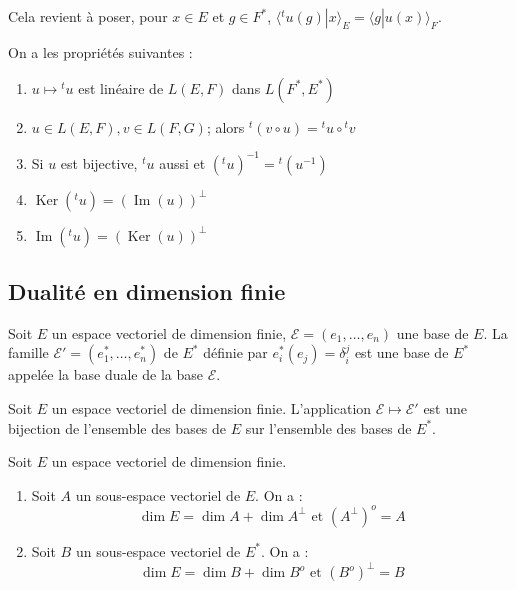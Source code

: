 \begin{rem}
Cela revient à poser, pour $x \in E$ et $g \in F^*$, $\langle {}^tu(g)|x\rangle_E = \langle g|u(x)\rangle_F$.
\end{rem}

\begin{thm}
On a les propriétés suivantes :
\begin{enumerate}
\item $u \mapsto {}^tu$ est linéaire de $L(E,F)$ dans $L(F^*,E^*)$
\item $u \in L(E,F), v \in L(F,G)$; alors ${}^t(v \circ u) = {}^tu \circ {}^tv$
\item Si $u$ est bijective, ${}^tu$ aussi et $({}^tu)^{-1} = {}^t(u^{-1})$
\item $\operatorname{Ker}({}^tu) = (\operatorname{Im}(u))^\perp$
\item $\operatorname{Im}({}^tu) = (\operatorname{Ker}(u))^\perp$
\end{enumerate}
\end{thm}

\subsection{Dualité en dimension finie}

\begin{prop}
Soit $E$ un espace vectoriel de dimension finie, $\mathcal{E} = (e_1,\ldots,e_n)$ une base de $E$. La famille $\mathcal{E}' = (e_1^*,\ldots,e_n^*)$ de $E^*$ définie par $e_i^*(e_j) = \delta_i^j$ est une base de $E^*$ appelée la base duale de la base $\mathcal{E}$.
\end{prop}

\begin{thm}
Soit $E$ un espace vectoriel de dimension finie. L'application $\mathcal{E} \mapsto \mathcal{E}'$ est une bijection de l'ensemble des bases de $E$ sur l'ensemble des bases de $E^*$.
\end{thm}

\begin{cor}
Soit $E$ un espace vectoriel de dimension finie.
\begin{enumerate}
\item Soit $A$ un sous-espace vectoriel de $E$. On a :
\[ \dim E = \dim A + \dim A^\perp \text{ et } (A^\perp)^o = A \]
\item Soit $B$ un sous-espace vectoriel de $E^*$. On a :
\[ \dim E = \dim B + \dim B^o \text{ et } (B^o)^\perp = B \]
\end{enumerate}
\end{cor}

